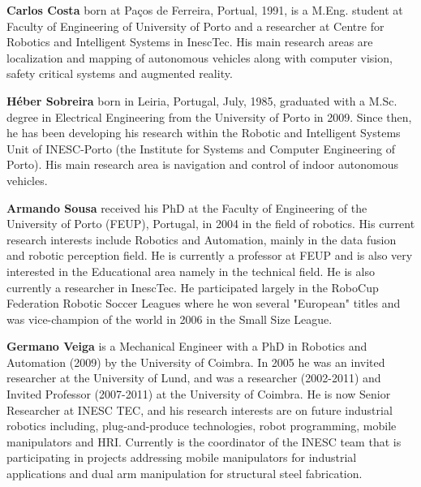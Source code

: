 \textbf{Carlos Costa} born at Paços de Ferreira, Portual, 1991, is a M.Eng. student at Faculty of Engineering of University of Porto and a researcher at Centre for Robotics and Intelligent Systems in InescTec. His main research areas are localization and mapping of autonomous vehicles along with computer vision, safety critical systems and augmented reality.

\textbf{Héber Sobreira} born in  Leiria, Portugal, July, 1985, graduated with a M.Sc. degree in Electrical Engineering from the University of Porto in 2009. Since then, he has been developing his research within the Robotic and Intelligent Systems Unit of INESC-Porto (the Institute for Systems and Computer Engineering of Porto). His main research area is navigation and control of indoor autonomous vehicles.

\textbf{Armando Sousa} received his PhD at the Faculty of Engineering of the University of Porto (FEUP), Portugal, in 2004 in the field of robotics. His current research interests include Robotics and Automation, mainly in the data fusion and robotic perception field. He is currently a professor at FEUP and is also very interested in the Educational area namely in the technical field. He is also currently a researcher in InescTec. He participated largely in the RoboCup Federation Robotic Soccer Leagues where he won several "European" titles and was vice-champion of the world in 2006 in the Small Size League.

\textbf{Germano Veiga} is a Mechanical Engineer with a PhD in Robotics and Automation (2009) by the University of Coimbra. In 2005 he was an invited researcher at the University of Lund, and was a researcher (2002-2011) and Invited Professor (2007-2011) at the University of Coimbra. He is now Senior Researcher at INESC TEC, and his research interests are on future industrial robotics including, plug-and-produce technologies, robot programming, mobile manipulators and HRI. Currently is the coordinator of the INESC team that is participating in projects addressing mobile manipulators for industrial applications and dual arm manipulation for structural steel fabrication.
